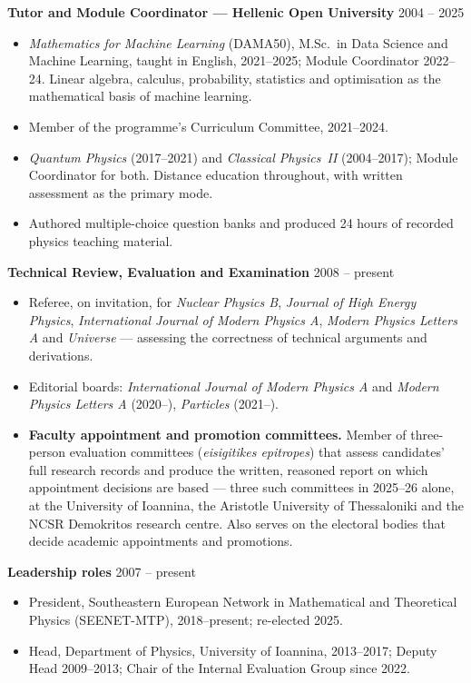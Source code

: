 \documentclass[a4paper,10.5pt]{article}
\newcommand{\jobline}[2]{\textbf{#1} \hfill #2\par\vspace{1pt}}
\begin{document}
\vspace{5pt}
\jobline{Tutor and Module Coordinator --- Hellenic Open University}{2004 -- 2025}
\begin{itemize}
\item \textit{Mathematics for Machine Learning} (DAMA50), M.Sc.\ in Data
  Science and Machine Learning, taught in English, 2021--2025; Module
  Coordinator 2022--24. Linear algebra, calculus, probability, statistics
  and optimisation as the mathematical basis of machine learning.
\item Member of the programme's Curriculum Committee, 2021--2024.
\item \textit{Quantum Physics} (2017--2021) and \textit{Classical
  Physics~II} (2004--2017); Module Coordinator for both. Distance
  education throughout, with written assessment as the primary mode.
\item Authored multiple-choice question banks and produced 24 hours of
  recorded physics teaching material.
\end{itemize}

\vspace{5pt}
\jobline{Technical Review, Evaluation and Examination}{2008 -- present}
\begin{itemize}
\item Referee, on invitation, for \textit{Nuclear Physics B},
  \textit{Journal of High Energy Physics}, \textit{International Journal
  of Modern Physics A}, \textit{Modern Physics Letters A} and
  \textit{Universe} --- assessing the correctness of technical arguments
  and derivations.
\item Editorial boards: \textit{International Journal of Modern Physics A}
  and \textit{Modern Physics Letters A} (2020--), \textit{Particles}
  (2021--).
\item \textbf{Faculty appointment and promotion committees.} Member of
  three-person evaluation committees (\textit{eisigitikes epitropes})
  that assess candidates' full research records and produce the written,
  reasoned report on which appointment decisions are based --- three such
  committees in 2025--26 alone, at the University of Ioannina, the
  Aristotle University of Thessaloniki and the NCSR Demokritos research
  centre. Also serves on the electoral bodies that decide academic
  appointments and promotions.
\end{itemize}

\vspace{5pt}
\jobline{Leadership roles}{2007 -- present}
\begin{itemize}
\item President, Southeastern European Network in Mathematical and
  Theoretical Physics (SEENET-MTP), 2018--present; re-elected 2025.
\item Head, Department of Physics, University of Ioannina, 2013--2017;
  Deputy Head 2009--2013; Chair of the Internal Evaluation Group since
  2022.
\end{itemize}
\end{document}
